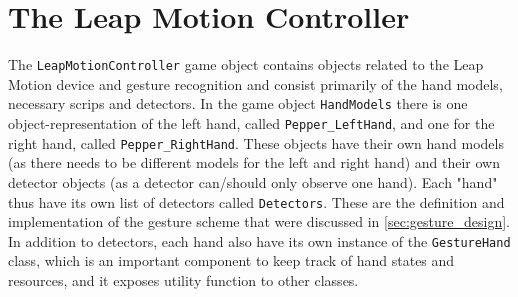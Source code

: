 \section{The Leap Motion Controller}
The \texttt{LeapMotionController} game object contains objects related to the Leap Motion device and gesture recognition and consist primarily of the hand models, necessary 
scrips and detectors. In the game object \texttt{HandModels} there is one object-representation of the left hand, called \texttt{Pepper\_LeftHand}, and one for the 
right hand, called \texttt{Pepper\_RightHand}. These objects have their own hand models (as there needs to be different models for the left and right hand) and their 
own detector objects (as a detector can/should only observe one hand). Each "hand" thus have its own list of detectors called \texttt{Detectors}. 
These are the definition and implementation of the gesture scheme that were discussed in \ref{sec:gesture_design}. In addition to detectors, each
hand also have its own instance of the \texttt{GestureHand} class, which is an important component to keep track of hand states and resources, and
it exposes utility function to other classes. 

